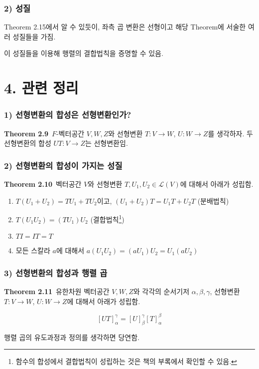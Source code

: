 \subsubsection*{2) 성질}
Theorem 2.15에서 알 수 있듯이, 좌측 곱 변환은 선형이고 해당 Theorem에 서술한 여러 성질들을 가짐.

이 성질들을 이용해 행렬의 결합법칙을 증명할 수 있음.


\newpage


\section*{4. 관련 정리}

\subsubsection*{1) 선형변환의 합성은 선형변환인가?}
\textbf{Theorem 2.9}\, $F$-벡터공간 $V,W,Z$와 선형변환 $T:V \rightarrow W$, $U:W \rightarrow Z$를 생각하자. 두 선형변환의 합성 $UT:V \rightarrow Z$는 선형변환임.

\subsubsection*{2) 선형변환의 합성이 가지는 성질}
\textbf{Theorem 2.10}\, 벡터공간 $V$와 선형변환 $T,U_1,U_2 \in \mathcal{L}(V)$에 대해서 아래가 성립함.

\begin{enumerate}
    \item $T(U_1+U_2)=TU_1+TU_2$이고, $(U_1+U_2)T=U_1T+U_2T$ (분배법칙)
    \item $T(U_1U_2)=(TU_1)U_2$ (결합법칙\footnote{함수의 합성에서 결합법칙이 성립하는 것은 책의 부록에서 확인할 수 있음.})
    \item $TI=IT=T$
    \item 모든 스칼라 $a$에 대해서 $a(U_1U_2)=(aU_1)U_2=U_1(aU_2)$
\end{enumerate}

\subsubsection*{3) 선형변환의 합성과 행렬 곱}
\textbf{Theorem 2.11}\, 유한차원 벡터공간 $V,W,Z$와 각각의 순서기저 $\alpha,\beta,\gamma$, 선형변환 $T:V \rightarrow W$, $U:W \rightarrow Z$에 대해서 아래가 성립함.

\[
[UT]_{\alpha}^{\gamma}=[U]_{\beta}^{\gamma}[T]_{\alpha}^{\beta}
\]

행렬 곱의 유도과정과 정의를 생각하면 당연함.


